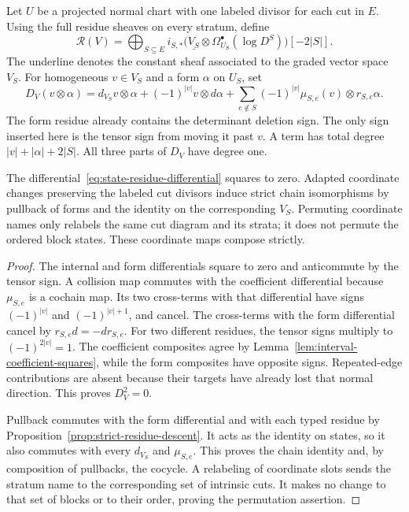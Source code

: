 Let $U$ be a projected normal chart with one labeled divisor for each cut in $E$.
Using the full residue sheaves on every stratum, define
\begin{equation}
\label{eq:state-residue-carrier}
\mathcal R(V)=\bigoplus_{S\subseteq E}
 i_{S,*}\bigl(\underline{V_S}\otimes\Omega^\bullet_{U_S}(\log D^S)\bigr)[-2|S|].
\end{equation}
The underline denotes the constant sheaf associated to the graded vector space $V_S$.
For homogeneous $v\in V_S$ and a form $\alpha$ on $U_S$, set
\begin{equation}
\label{eq:state-residue-differential}
D_V(v\otimes\alpha)=d_{V_S}v\otimes\alpha
+(-1)^{|v|}v\otimes d\alpha
+\sum_{e\notin S}(-1)^{|v|}\mu_{S,e}(v)\otimes r_{S,e}\alpha.
\end{equation}
The form residue already contains the determinant deletion sign.
The only sign inserted here is the tensor sign from moving it past $v$.
A term has total degree $|v|+|\alpha|+2|S|$.
All three parts of $D_V$ have degree one.

\begin{proposition}
\label{prop:state-residue-complex}
The differential~\eqref{eq:state-residue-differential} squares to zero.
Adapted coordinate changes preserving the labeled cut divisors induce strict chain isomorphisms by pullback of forms and the identity on the corresponding $V_S$.
Permuting coordinate names only relabels the same cut diagram and its strata; it does not permute the ordered block states.
These coordinate maps compose strictly.
\end{proposition}

\begin{proof}
The internal and form differentials square to zero and anticommute by the tensor sign.
A collision map commutes with the coefficient differential because $\mu_{S,e}$ is a cochain map.
Its two cross-terms with that differential have signs $(-1)^{|v|}$ and $(-1)^{|v|+1}$, and cancel.
The cross-terms with the form differential cancel by $r_{S,e}d=-dr_{S,e}$.
For two different residues, the tensor signs multiply to $(-1)^{2|v|}=1$.
The coefficient composites agree by Lemma~\ref{lem:interval-coefficient-squares}, while the form composites have opposite signs.
Repeated-edge contributions are absent because their targets have already lost that normal direction.
This proves $D_V^2=0$.

Pullback commutes with the form differential and with each typed residue by Proposition~\ref{prop:strict-residue-descent}.
It acts as the identity on states, so it also commutes with every $d_{V_S}$ and $\mu_{S,e}$.
This proves the chain identity and, by composition of pullbacks, the cocycle.
A relabeling of coordinate slots sends the stratum name to the corresponding set of intrinsic cuts.
It makes no change to that set of blocks or to their order, proving the permutation assertion.
\end{proof}

